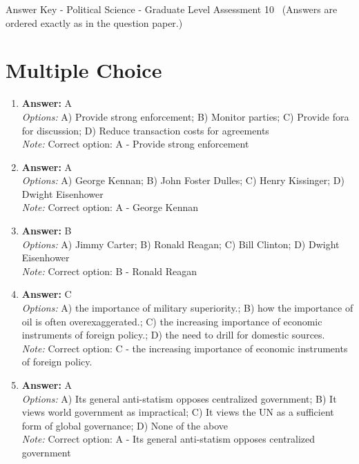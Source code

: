 \documentclass[12pt]{article}
\begin{document}
\begin{center}
Answer Key - Political Science - Graduate Level Assessment 10 \
\small (Answers are ordered exactly as in the question paper.)
\end{center}

\section*{Multiple Choice}
\begin{enumerate}[label=\arabic*.]
\item \textbf{Answer:} A
\\ \textit{Options:} A) Provide strong enforcement; B) Monitor parties; C) Provide fora for discussion; D) Reduce transaction costs for agreements
\\ \textit{Note:} Correct option: A - Provide strong enforcement
\item \textbf{Answer:} A
\\ \textit{Options:} A) George Kennan; B) John Foster Dulles; C) Henry Kissinger; D) Dwight Eisenhower
\\ \textit{Note:} Correct option: A - George Kennan
\item \textbf{Answer:} B
\\ \textit{Options:} A) Jimmy Carter; B) Ronald Reagan; C) Bill Clinton; D) Dwight Eisenhower
\\ \textit{Note:} Correct option: B - Ronald Reagan
\item \textbf{Answer:} C
\\ \textit{Options:} A) the importance of military superiority.; B) how the importance of oil is often overexaggerated.; C) the increasing importance of economic instruments of foreign policy.; D) the need to drill for domestic sources.
\\ \textit{Note:} Correct option: C - the increasing importance of economic instruments of foreign policy.
\item \textbf{Answer:} A
\\ \textit{Options:} A) Its general anti-statism opposes centralized government; B) It views world government as impractical; C) It views the UN as a sufficient form of global governance; D) None of the above
\\ \textit{Note:} Correct option: A - Its general anti-statism opposes centralized government
\end{enumerate}
\end{document}
